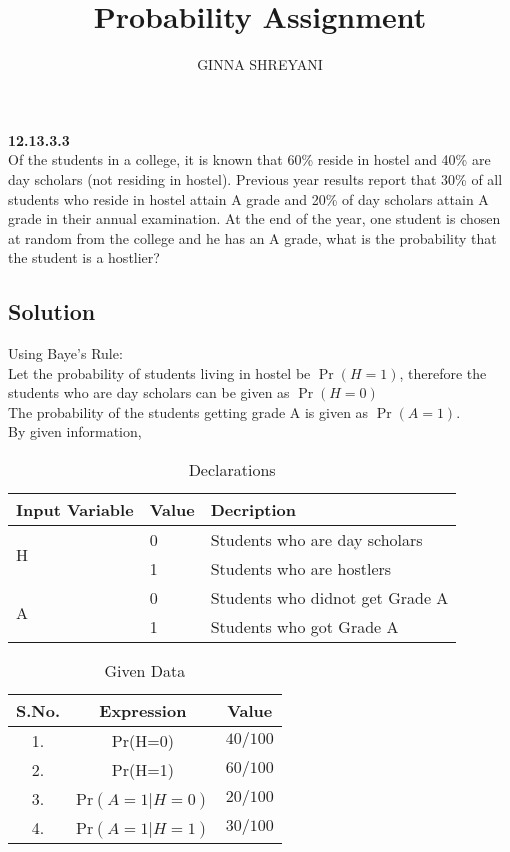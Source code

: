 \documentclass[12pt,twocolumn]{article}
\title{
Probability Assignment
}
\author{GINNA SHREYANI}
\date{}
\providecommand{\pr}[1]{\ensuremath{\Pr\left(#1\right)}}
\begin{document}
\maketitle

\textbf{12.13.3.3}\\
Of the students in a college, it is known that 60\% reside in hostel and 40\% are day scholars (not residing in hostel). Previous year results report that 30\% of all students who reside in hostel attain A grade and 20\% of day scholars attain A grade in their annual examination. At the end of the year, one student is chosen at random from the college and he has an A grade, what is the probability that the student is a hostlier?
\subsection*{Solution}
Using Baye's Rule:\\
Let the probability of students living in hostel be $\pr{H=1}$, therefore the students who are day scholars can be given as $\pr{H=0}$\\
The probability of the students getting grade A is given as $\pr{A=1}$.\\
By given information,
%	


\begin{table}[h]
\begin{adjustbox}{width=\columnwidth,center}
\begin{tabular}{|l|l|l|}
\hline
        Input Variable  &  Value &  Decription\\
\hline
\multirow{2}{*}{H} & 0 &  Students who are day scholars\\ \cline{2-3}
                   & 1 &  Students who are hostlers\\ \hline
\multirow{2}{*}{A} & 0 &  Students who didnot get Grade A     \\ \cline{2-3}
                   & 1 &  Students who got Grade A    \\ \hline
\end{tabular}
\end{adjustbox}
\caption{Declarations}
\end{table}

\begin{table}[!ht]
\centering
\begin{tabular}{|c|c|c|}
\hline
S.No. & Expression & Value \\
\hline
1. &  Pr(H=0) & $40/100$ \\
\hline
2. & Pr(H=1) & $60/100$ \\
\hline
3. & Pr$(A=1|H=0)$ & $20/100$\\
\hline
4. & Pr$(A=1|H=1)$ & $30/100$ \\
\hline
\end{tabular}
\caption{Given Data}
\end{table}
\end{document}
